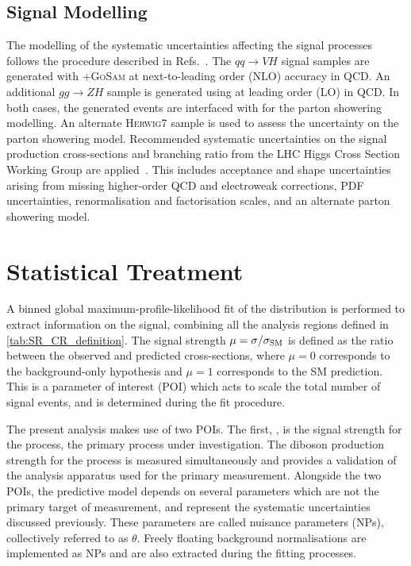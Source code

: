 \subsection{Signal Modelling}

The modelling of the systematic uncertainties affecting the signal processes follows the procedure described in Refs.~\cite{HIGG-2018-50,deFlorian:2016spz,HIGG-2016-29,ATL-PHYS-PUB-2018-035,Proceedings:2018jsb}.
The $qq \rightarrow VH$ signal samples are generated with \POWHEGBOX[v2]+\textsc{GoSam} at next-to-leading order (NLO) accuracy in QCD. 
An additional $gg \rightarrow ZH$ sample is generated using \POWHEGBOX[v2] at leading order (LO) in QCD.
In both cases, the generated events are interfaced with  for the parton showering modelling.
An alternate \textsc{Herwig7} sample is used to assess the uncertainty on the parton showering model.
Recommended systematic uncertainties on the signal production cross-sections and \Hbb branching ratio from the LHC Higgs Cross Section Working Group are applied~\cite{Dittmaier:2012vm,Heinemeyer:2013tqa}.
This includes acceptance and shape uncertainties arising from missing higher-order QCD and electroweak corrections, PDF uncertainties, renormalisation and factorisation scales, and an alternate parton showering model.

\section{Statistical Treatment}\label{sec:vhbb_fit}

A binned global maximum-profile-likelihood fit of the \mJ distribution is performed to extract information on the signal, combining all the analysis regions defined in \cref{tab:SR_CR_definition}.
The signal strength $\mu = \sigma / \sigma_{\textnormal{SM}}$ is defined as the ratio between the observed and predicted cross-sections, where $\mu = 0$ corresponds to the background-only hypothesis and $\mu = 1$ corresponds to the SM prediction.
This is a parameter of interest (POI) which acts to scale the total number of signal events, and is determined during the fit procedure.

The present analysis makes use of two POIs.
The first, \muVH, is the signal strength for the \VHbb process, the primary process under investigation.
The diboson production strength \muVZ for the \VZbb process is measured simultaneously and provides a validation of the analysis apparatus used for the primary \Hbb measurement.
Alongside the two POIs, the predictive model depends on several parameters which are not the primary target of measurement, and represent the systematic uncertainties discussed previously.
These parameters are called nuisance parameters (NPs), collectively referred to as $\theta$.
Freely floating background normalisations are implemented as NPs and are also extracted during the fitting processes.


